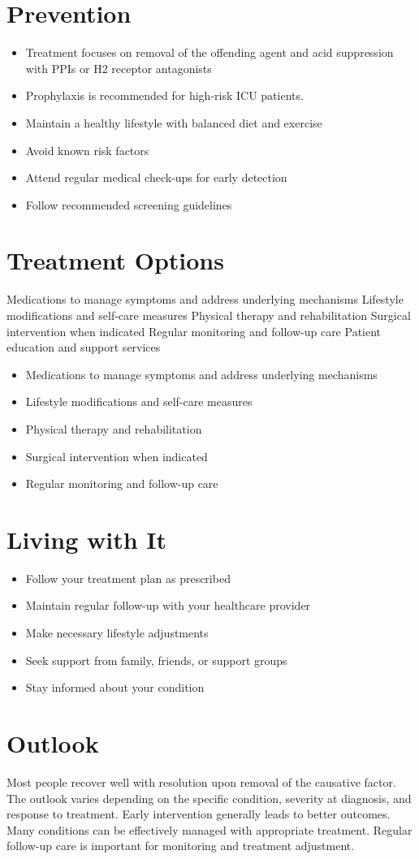 \section{Prevention}
\begin{itemize}[noitemsep]
  \item Treatment focuses on removal of the offending agent and acid suppression with PPIs or H2 receptor antagonists
  \item Prophylaxis is recommended for high-risk ICU patients.
  \item Maintain a healthy lifestyle with balanced diet and exercise
  \item Avoid known risk factors
  \item Attend regular medical check-ups for early detection
  \item Follow recommended screening guidelines
\end{itemize}
\section{Treatment Options}
Medications to manage symptoms and address underlying mechanisms Lifestyle modifications and self-care measures Physical therapy and rehabilitation Surgical intervention when indicated Regular monitoring and follow-up care Patient education and support services

\begin{itemize}[noitemsep]
  \item Medications to manage symptoms and address underlying mechanisms
  \item Lifestyle modifications and self-care measures
  \item Physical therapy and rehabilitation
  \item Surgical intervention when indicated
  \item Regular monitoring and follow-up care
\end{itemize}
\section{Living with It}
\begin{itemize}[noitemsep]
  \item Follow your treatment plan as prescribed
  \item Maintain regular follow-up with your healthcare provider
  \item Make necessary lifestyle adjustments
  \item Seek support from family, friends, or support groups
  \item Stay informed about your condition
\end{itemize}
\section{Outlook}
Most people recover well with resolution upon removal of the causative factor. The outlook varies depending on the specific condition, severity at diagnosis, and response to treatment. Early intervention generally leads to better outcomes. Many conditions can be effectively managed with appropriate treatment. Regular follow-up care is important for monitoring and treatment adjustment.
